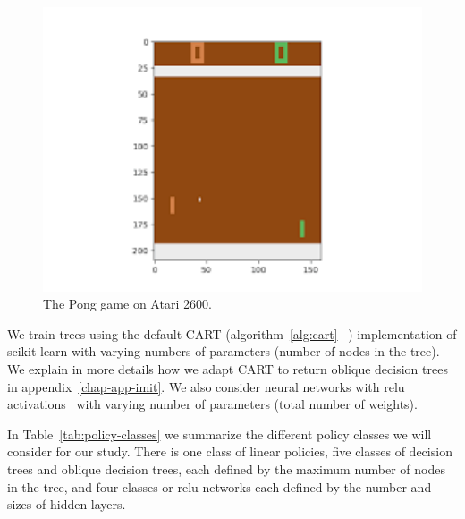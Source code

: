 \begin{figure}
\begin{minipage}{0.47\textwidth}
  \end{minipage}
  \hfill
  \begin{minipage}{0.47\textwidth}
  \includegraphics[width=1\textwidth]{images/images_part3/pong.png}
  \caption{The Pong game on Atari 2600.}\label{lst:generic-linear}
  \end{minipage}
  \end{figure}
We train trees using the default CART (algorithm~\ref{alg:cart} ~\cite{breiman1984classification}) implementation of scikit-learn with varying numbers of parameters (number of nodes in the tree).
We explain in more details how we adapt CART to return oblique decision trees in appendix~\ref{chap-app-imit}.
We also consider neural networks with relu activations~\cite{relunet} with varying number of parameters (total number of weights).

In Table~\ref{tab:policy-classes} we summarize the different policy classes we will consider for our study.
There is one class of linear policies, five classes of decision trees and oblique decision trees, each defined by the maximum number of nodes in the tree, and four classes or relu networks each defined by the number and sizes of hidden layers.

